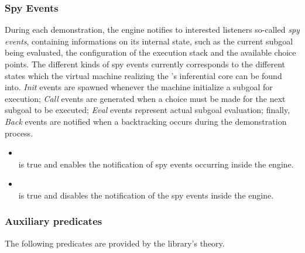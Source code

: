 \subsubsection{Spy Events}
%
During each demonstration, the engine notifies to interested listeners so-called
{\em spy events}, containing informations on its internal state, such as the
current subgoal being evaluated, the configuration of the execution stack and
the available choice points. The different kinds of spy events currently
corresponds to the different states which the virtual machine realizing the
\tuprolog{}'s inferential core can be found into. \textit{Init} events are
spawned whenever the machine initialize a subgoal for execution; \textit{Call}
events are generated when a choice must be made for the next subgoal to be
executed; \textit{Eval} events represent actual subgoal evaluation; finally,
\textit{Back} events are notified when a backtracking occurs during the
demonstration process.
%
\begin{itemize}
%
\item {}\\
\noindent{} is true and enables the notification of spy
events occurring inside the engine.\\
%
\item {}\\
\noindent{} is true and disables the notification of the
spy events inside the engine.\\
%
\end{itemize}

\subsubsection{Auxiliary predicates}

\noindent The following predicates are provided by the library's theory.

